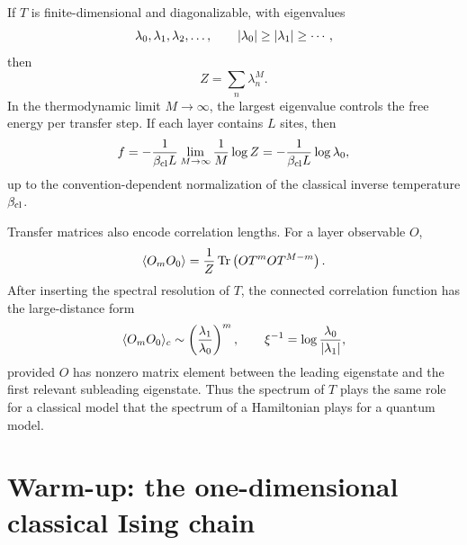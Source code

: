 If $T$ is finite-dimensional and diagonalizable, with eigenvalues
\begin{equation}
    \lambda_0,\lambda_1,\lambda_2,\ldots,
    \qquad
    \left|\lambda_0\right|\geq \left|\lambda_1\right|\geq\cdots,
\end{equation}
then
\begin{equation}
\label{eq:transfer-matrix-free-energy}
    Z=\sum_n \lambda_n^M .
\end{equation}
In the thermodynamic limit $M\to\infty$, the largest eigenvalue controls the free
energy per transfer step. If each layer contains $L$ sites, then
\begin{equation}
\label{eq:transfer-matrix-free-energy-density}
    f
    =
    -\frac{1}{\beta_{\rm cl}L}
    \lim_{M\to\infty}\frac{1}{M}\log Z
    =
    -\frac{1}{\beta_{\rm cl}L}\log \lambda_0,
\end{equation}
up to the convention-dependent normalization of the classical inverse temperature
$\beta_{\rm cl}$.

Transfer matrices also encode correlation lengths. For a layer observable $O$,
\begin{equation}
\label{eq:transfer-matrix-correlation-spectral}
    \langle O_m O_0\rangle
    =
    \frac{1}{Z}\operatorname{Tr}\left(O T^m O T^{M-m}\right).
\end{equation}
After inserting the spectral resolution of $T$, the connected correlation
function has the large-distance form
\begin{equation}
\label{eq:transfer-matrix-correlation-length}
    \langle O_m O_0\rangle_c
    \sim
    \left(\frac{\lambda_1}{\lambda_0}\right)^m,
    \qquad
    \xi^{-1}
    =
    \log\frac{\lambda_0}{\left|\lambda_1\right|},
\end{equation}
provided $O$ has nonzero matrix element between the leading eigenstate and the
first relevant subleading eigenstate. Thus the spectrum of $T$ plays the same
role for a classical model that the spectrum of a Hamiltonian plays for a quantum
model.

\section{Warm-up: the one-dimensional classical Ising chain}
\label{sec:transfer-matrix-1d-classical-ising}

